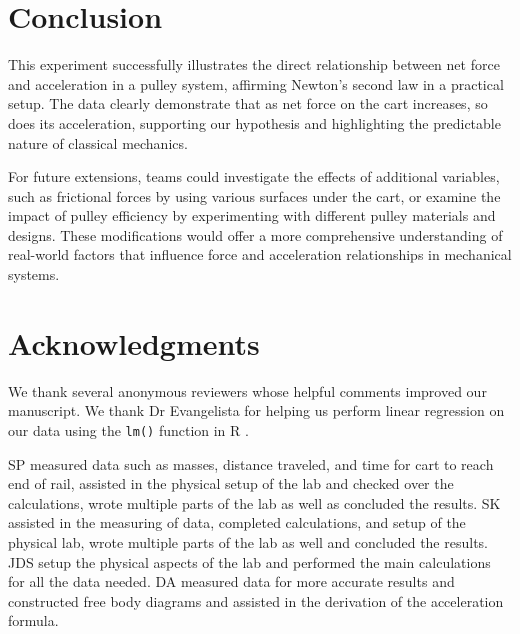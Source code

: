 ﻿\documentclass[reprint,amsmath,amssymb,aps,twoside]{revtex4-2}
\begin{document}
\section{Conclusion}


This experiment successfully illustrates the direct relationship between net force and acceleration in a pulley system, affirming Newton's second law \cite{tipler} in a practical setup. The data clearly demonstrate that as net force on the cart increases, so does its acceleration, supporting our hypothesis and highlighting the predictable nature of classical mechanics.

For future extensions, teams could investigate the effects of additional variables, such as frictional forces by using various surfaces under the cart, or examine the impact of pulley efficiency by experimenting with different pulley materials and designs. These modifications would offer a more comprehensive understanding of real-world factors that influence force and acceleration relationships in mechanical systems.









\section{Acknowledgments}\label{sec:Acknowledgements}


We thank several anonymous reviewers whose helpful comments improved our manuscript. We thank Dr Evangelista for helping us perform linear regression on our data using the \texttt{lm()} function in R \cite{R2024}. 

SP measured data such as masses, distance traveled, and time for cart to reach end of rail, assisted in the physical setup of the lab and checked over the calculations, wrote multiple parts of the lab as well as concluded the results.  SK assisted in the measuring of data, completed calculations, and setup of the physical lab, wrote multiple parts of the lab as well and concluded the results. JDS setup the physical aspects of the lab and performed the main calculations for all the data needed. DA measured data for more accurate results and constructed free body diagrams and assisted in the derivation of the acceleration formula.
\end{document}
